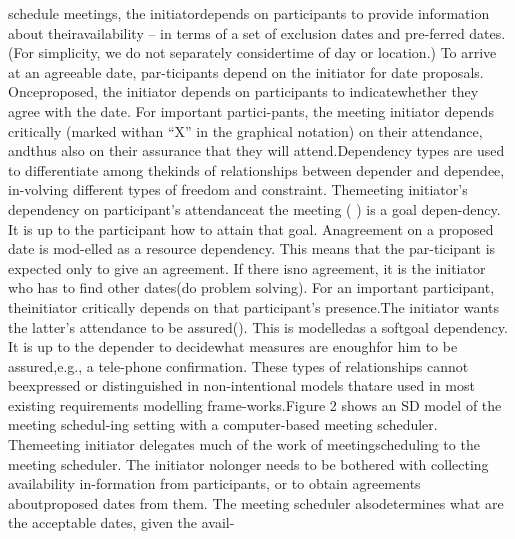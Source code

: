 schedule meetings, the initiatordepends on participants to provide information about theiravailability – in terms of a set of exclusion dates and pre-ferred dates. (For simplicity, we do not separately considertime of day or location.) To arrive at an agreeable date, par-ticipants depend on the initiator for date proposals. Onceproposed, the initiator depends on participants to indicatewhether they agree with the date. For important partici-pants, the meeting initiator depends critically (marked withan “X” in the graphical notation) on their attendance, andthus also on their assurance that they will attend.Dependency types are used to differentiate among thekinds of relationships between depender and dependee, in-volving different types of freedom and constraint. Themeeting initiator’s dependency on participant’s attendanceat the meeting ( ) is a goal depen-dency. It is up to the participant how to attain that goal. Anagreement on a proposed date is mod-elled as a resource dependency. This means that the par-ticipant is expected only to give an agreement. If there isno agreement, it is the initiator who has to ﬁnd other dates(do problem solving). For an important participant, theinitiator critically depends on that participant’s presence.The initiator wants the latter’s attendance to be assured(). This is modelledas a softgoal dependency. It is up to the depender to decidewhat measures are enoughfor him to be assured,e.g., a tele-phone conﬁrmation. These types of relationships cannot beexpressed or distinguished in non-intentional models thatare used in most existing requirements modelling frame-works.Figure 2 shows an SD model of the meeting schedul-ing setting with a computer-based meeting scheduler. Themeeting initiator delegates much of the work of meetingscheduling to the meeting scheduler. The initiator nolonger needs to be bothered with collecting availability in-formation from participants, or to obtain agreements aboutproposed dates from them. The meeting scheduler alsodetermines what are the acceptable dates, given the avail-
